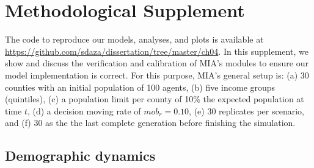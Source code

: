\makeatletter
\def\@seccntformat#1{\csname #1ignore\expandafter\endcsname\csname the#1\endcsname\quad}
\renewcommand{\@seccntformat}[1]{}
\let\sectionignore\@gobbletwo
\let\latex@numberline\numberline
\def\numberline#1{\if\relax#1\relax\else\latex@numberline{#1}\fi}
\makeatother


\doublespacing

\onlyifstandalone{
\begin{refsection}
}

\section{Methodological Supplement}\label{ch04:appendix}
\onlyifstandalone{
\setcounter{section}{0}
}

The code to reproduce our models, analyses, and plots is available at \url{https://github.com/sdaza/dissertation/tree/master/ch04}. In this supplement, we show and discuss the verification and calibration of MIA's modules to ensure our model implementation is correct. For this purpose, MIA's general setup is: (a) 30 counties with an initial population of 100 agents, (b) five income groups (quintiles), (c) a population limit per county of 10\% the expected population at time $t$, (d) a decision moving rate of $mob_r = 0.10$, (e) 30 replicates per scenario, and (f) 30 as the the last complete generation before finishing the simulation.

\subsection{Demographic dynamics}\label{ch04:appendix_demographics}


